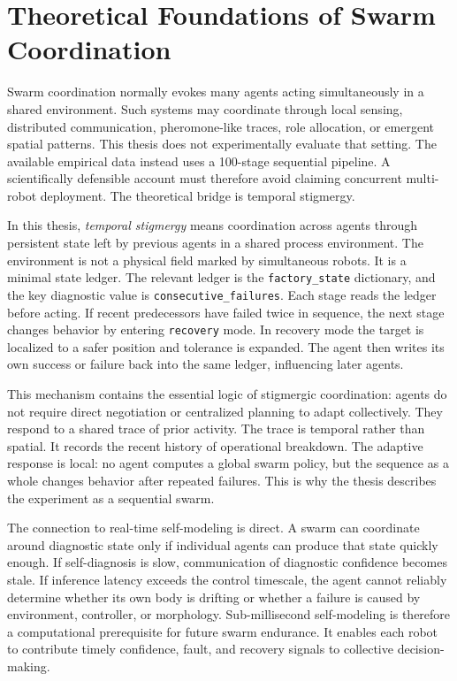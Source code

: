 \documentclass[12pt,a4paper,oneside]{report}
\begin{document}
\section{Theoretical Foundations of Swarm Coordination}

Swarm coordination normally evokes many agents acting simultaneously in a shared environment. Such systems may coordinate through local sensing, distributed communication, pheromone-like traces, role allocation, or emergent spatial patterns. This thesis does not experimentally evaluate that setting. The available empirical data instead uses a 100-stage sequential pipeline. A scientifically defensible account must therefore avoid claiming concurrent multi-robot deployment. The theoretical bridge is temporal stigmergy.

In this thesis, \emph{temporal stigmergy} means coordination across agents through persistent state left by previous agents in a shared process environment. The environment is not a physical field marked by simultaneous robots. It is a minimal state ledger. The relevant ledger is the \texttt{factory\_state} dictionary, and the key diagnostic value is \texttt{consecutive\_failures}. Each stage reads the ledger before acting. If recent predecessors have failed twice in sequence, the next stage changes behavior by entering \texttt{recovery} mode. In recovery mode the target is localized to a safer position and tolerance is expanded. The agent then writes its own success or failure back into the same ledger, influencing later agents.

This mechanism contains the essential logic of stigmergic coordination: agents do not require direct negotiation or centralized planning to adapt collectively. They respond to a shared trace of prior activity. The trace is temporal rather than spatial. It records the recent history of operational breakdown. The adaptive response is local: no agent computes a global swarm policy, but the sequence as a whole changes behavior after repeated failures. This is why the thesis describes the experiment as a sequential swarm.

The connection to real-time self-modeling is direct. A swarm can coordinate around diagnostic state only if individual agents can produce that state quickly enough. If self-diagnosis is slow, communication of diagnostic confidence becomes stale. If inference latency exceeds the control timescale, the agent cannot reliably determine whether its own body is drifting or whether a failure is caused by environment, controller, or morphology. Sub-millisecond self-modeling is therefore a computational prerequisite for future swarm endurance. It enables each robot to contribute timely confidence, fault, and recovery signals to collective decision-making.
\end{document}
